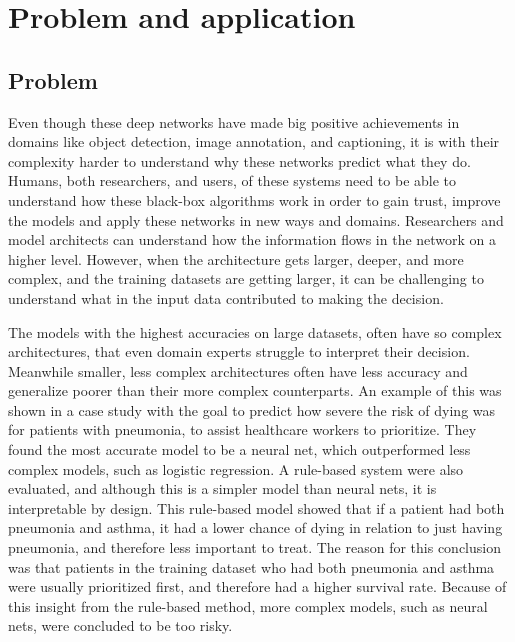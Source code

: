 \label{sec:2_problem_and_application}
\section{Problem and application}
\subsection{Problem}

Even though these deep networks have made big positive achievements in domains like object detection\cite{girshickRichFeatureHierarchies2014, renFasterRCNNRealTime2015, redmonYouOnlyLook2016, linFocalLossDense2017}, image annotation, and captioning\cite{vinyalsShowTellNeural2015, karpathyDeepVisualSemanticAlignments2015, johnsonDenseCapFullyConvolutional2016, tranRichImageCaptioning2016}, it is with their complexity harder to understand why these networks predict what they do. Humans, both researchers, and users, of these systems need to be able to understand how these black-box algorithms work in order to gain trust\cite{koehlerExplanationImaginationConfidence1991, herlockerExplainingCollaborativeFiltering2000, dzindoletRoleTrustAutomation2003}, improve the models and apply these networks in new ways and domains\cite{jiangArtificialIntelligenceHealthcare2017, tonekaboniWhatCliniciansWant2019, holzingerCausabilityExplainabilityArtificial2019, guptaDeepLearningObject2021, tjoaSurveyExplainableArtificial2021}. Researchers and model architects can understand how the information flows in the network on a higher level. However, when the architecture gets larger, deeper, and more complex, and the training datasets are getting larger, it can be challenging to understand what in the input data contributed to making the decision\cite{sagirogluBigDataReview2013}.

The models with the highest accuracies on large datasets, often have so complex architectures, that even domain experts struggle to interpret their decision\cite{caruanaIntelligibleModelsHealthCare2015}. Meanwhile smaller, less complex architectures often have less accuracy and generalize poorer than their more complex counterparts. An example of this was shown in a case study with the goal to predict how severe the risk of dying was for patients with pneumonia, to assist healthcare workers to prioritize\cite{cooperPredictingDireOutcomes2005}. They found the most accurate model to be a neural net, which outperformed less complex models, such as logistic regression. A rule-based system were also evaluated, and although this is a simpler model than neural nets, it is interpretable by design. This rule-based model showed that if a patient had both pneumonia and asthma, it had a lower chance of dying in relation to just having pneumonia, and therefore less important to treat. The reason for this conclusion was that patients in the training dataset who had both pneumonia and asthma were usually prioritized first, and therefore had a higher survival rate\cite{cooperEvaluationMachinelearningMethods1997}. Because of this insight from the rule-based method, more complex models, such as neural nets, were concluded to be too risky.

